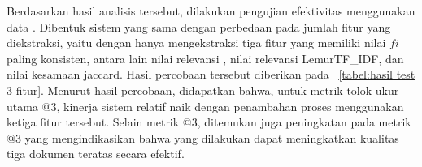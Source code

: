 Berdasarkan hasil analisis \feature{} \importance{} tersebut, dilakukan pengujian efektivitas menggunakan data \testing{}. Dibentuk sistem yang sama dengan perbedaan pada jumlah fitur yang diekstraksi, yaitu dengan hanya mengekstraksi tiga fitur yang memiliki nilai $fi$ paling konsisten, antara lain nilai relevansi \obm{}, nilai relevansi LemurTF\_IDF, dan nilai kesamaan jaccard. Hasil percobaan tersebut diberikan pada \tabel{}~\ref{tabel:hasil test 3 fitur}. Menurut hasil percobaan, didapatkan bahwa, untuk metrik tolok ukur utama \recall{}$@3$, kinerja sistem relatif naik dengan penambahan proses \reranking{} menggunakan ketiga fitur tersebut. Selain metrik \recall{}$@3$, ditemukan juga peningkatan pada metrik \precision{}$@3$ yang mengindikasikan bahwa \reranking{} yang dilakukan dapat meningkatkan kualitas tiga dokumen teratas secara efektif.
\begin{table}[H]
    \centering
    \caption{Hasil eksperimen pada data \testing{} menggunakan \reranker{} dengan masukan nilai relevansi \obm{} dan LemurTF\_IDF, serta JACCARD\_SCORE yang diurutkan berdasarkan metrik \recall{}@3}
    \label{tabel:hasil test 3 fitur}
\end{table}
